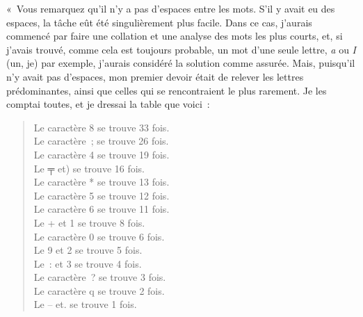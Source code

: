 \documentclass[french,twoside]{book} %
\begin{document}
« Vous remarquez qu’il n’y a pas d’espaces entre les mots. S’il y avait eu des espaces, la tâche eût été singulièrement plus facile. Dans ce cas, j’aurais commencé par faire une collation et une analyse des mots les plus courts, et, si j’avais trouvé, comme cela est toujours probable, un mot d’une seule lettre, \emph{a} ou \emph{I} (un, je) par exemple, j’aurais considéré la solution comme assurée. Mais, puisqu’il n’y avait pas d’espaces, mon premier devoir était de relever les lettres prédominantes, ainsi que celles qui se rencontraient le plus rarement. Je les comptai toutes, et je dressai la table que voici :\par


\begin{verse}
Le caractère 8 se trouve 33 fois.\\
Le caractère ; se trouve 26 fois.\\
Le caractère 4 se trouve 19 fois.\\
Le ╤ et) se trouve 16 fois.\\
Le caractère * se trouve 13 fois.\\
Le caractère 5 se trouve 12 fois.\\
Le caractère 6 se trouve 11 fois.\\
Le + et 1 se trouve 8 fois.\\
Le caractère 0 se trouve 6 fois.\\
Le 9 et 2 se trouve 5 fois.\\
Le : et 3 se trouve 4 fois.\\
Le caractère ? se trouve 3 fois.\\
Le caractère q se trouve 2 fois.\\
Le – et. se trouve 1 fois.\\
\end{verse}
\end{document}
